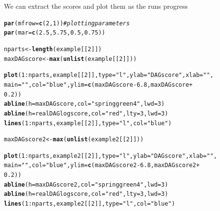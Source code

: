 \documentclass[a4paper]{article}\usepackage[]{graphicx}\usepackage[]{color}
\makeatletter
\newcommand{\hlnum}[1]{\textcolor[rgb]{0.686,0.059,0.569}{#1}}%
\newcommand{\hlstr}[1]{\textcolor[rgb]{0.192,0.494,0.8}{#1}}%
\newcommand{\hlcom}[1]{\textcolor[rgb]{0.678,0.584,0.686}{\textit{#1}}}%
\newcommand{\hlopt}[1]{\textcolor[rgb]{0,0,0}{#1}}%
\newcommand{\hlstd}[1]{\textcolor[rgb]{0.345,0.345,0.345}{#1}}%
\newcommand{\hlkwb}[1]{\textcolor[rgb]{0.69,0.353,0.396}{#1}}%
\newcommand{\hlkwc}[1]{\textcolor[rgb]{0.333,0.667,0.333}{#1}}%
\newcommand{\hlkwd}[1]{\textcolor[rgb]{0.737,0.353,0.396}{\textbf{#1}}}%
\newenvironment{kframe}{%
 \def\at@end@of@kframe{}%
 \ifinner\ifhmode%
  \def\at@end@of@kframe{\end{minipage}}%
  \begin{minipage}{\columnwidth}%
 \fi\fi%
 \def\FrameCommand##1{\hskip\@totalleftmargin \hskip-\fboxsep
 \colorbox{shadecolor}{##1}\hskip-\fboxsep
     \hskip-\linewidth \hskip-\@totalleftmargin \hskip\columnwidth}%
 \MakeFramed {\advance\hsize-\width
   \@totalleftmargin\z@ \linewidth\hsize
   \@setminipage}}%
 {\par\unskip\endMakeFramed%
 \at@end@of@kframe}
\newenvironment{knitrout}{}{} %
\makeatother
\begin{document}
We can extract the scores and plot them as the runs progress

\begin{knitrout}
\color{fgcolor}\begin{kframe}
\begin{alltt}
\hlkwd{par}\hlstd{(}\hlkwc{mfrow} \hlstd{=} \hlkwd{c}\hlstd{(}\hlnum{2}\hlstd{,} \hlnum{1}\hlstd{))}  \hlcom{# plotting parameters}
\hlkwd{par}\hlstd{(}\hlkwc{mar} \hlstd{=} \hlkwd{c}\hlstd{(}\hlnum{2.5}\hlstd{,} \hlnum{5.75}\hlstd{,} \hlnum{0.5}\hlstd{,} \hlnum{0.75}\hlstd{))}

\hlstd{nparts} \hlkwb{<-} \hlkwd{length}\hlstd{(example[[}\hlnum{2}\hlstd{]])}
\hlstd{maxDAGscore} \hlkwb{<-} \hlkwd{max}\hlstd{(}\hlkwd{unlist}\hlstd{(example[[}\hlnum{2}\hlstd{]]))}

\hlkwd{plot}\hlstd{(}\hlnum{1}\hlopt{:}\hlstd{nparts, example[[}\hlnum{2}\hlstd{]],} \hlkwc{type} \hlstd{=} \hlstr{"l"}\hlstd{,} \hlkwc{ylab} \hlstd{=} \hlstr{"DAG score"}\hlstd{,} \hlkwc{xlab} \hlstd{=} \hlstr{""}\hlstd{,}
    \hlkwc{main} \hlstd{=} \hlstr{""}\hlstd{,} \hlkwc{col} \hlstd{=} \hlstr{"blue"}\hlstd{,} \hlkwc{ylim} \hlstd{=} \hlkwd{c}\hlstd{(maxDAGscore} \hlopt{-} \hlnum{6.8}\hlstd{, maxDAGscore} \hlopt{+}
        \hlnum{0.2}\hlstd{))}
\hlkwd{abline}\hlstd{(}\hlkwc{h} \hlstd{= maxDAGscore,} \hlkwc{col} \hlstd{=} \hlstr{"springgreen4"}\hlstd{,} \hlkwc{lwd} \hlstd{=} \hlnum{3}\hlstd{)}
\hlkwd{abline}\hlstd{(}\hlkwc{h} \hlstd{= realDAGlogscore,} \hlkwc{col} \hlstd{=} \hlstr{"red"}\hlstd{,} \hlkwc{lty} \hlstd{=} \hlnum{3}\hlstd{,} \hlkwc{lwd} \hlstd{=} \hlnum{3}\hlstd{)}
\hlkwd{lines}\hlstd{(}\hlnum{1}\hlopt{:}\hlstd{nparts, example[[}\hlnum{2}\hlstd{]],} \hlkwc{type} \hlstd{=} \hlstr{"l"}\hlstd{,} \hlkwc{col} \hlstd{=} \hlstr{"blue"}\hlstd{)}

\hlstd{maxDAGscore2} \hlkwb{<-} \hlkwd{max}\hlstd{(}\hlkwd{unlist}\hlstd{(example2[[}\hlnum{2}\hlstd{]]))}

\hlkwd{plot}\hlstd{(}\hlnum{1}\hlopt{:}\hlstd{nparts, example2[[}\hlnum{2}\hlstd{]],} \hlkwc{type} \hlstd{=} \hlstr{"l"}\hlstd{,} \hlkwc{ylab} \hlstd{=} \hlstr{"DAG score"}\hlstd{,} \hlkwc{xlab} \hlstd{=} \hlstr{""}\hlstd{,}
    \hlkwc{main} \hlstd{=} \hlstr{""}\hlstd{,} \hlkwc{col} \hlstd{=} \hlstr{"blue"}\hlstd{,} \hlkwc{ylim} \hlstd{=} \hlkwd{c}\hlstd{(maxDAGscore2} \hlopt{-} \hlnum{6.8}\hlstd{, maxDAGscore2} \hlopt{+}
        \hlnum{0.2}\hlstd{))}
\hlkwd{abline}\hlstd{(}\hlkwc{h} \hlstd{= maxDAGscore2,} \hlkwc{col} \hlstd{=} \hlstr{"springgreen4"}\hlstd{,} \hlkwc{lwd} \hlstd{=} \hlnum{3}\hlstd{)}
\hlkwd{abline}\hlstd{(}\hlkwc{h} \hlstd{= realDAGlogscore,} \hlkwc{col} \hlstd{=} \hlstr{"red"}\hlstd{,} \hlkwc{lty} \hlstd{=} \hlnum{3}\hlstd{,} \hlkwc{lwd} \hlstd{=} \hlnum{3}\hlstd{)}
\hlkwd{lines}\hlstd{(}\hlnum{1}\hlopt{:}\hlstd{nparts, example2[[}\hlnum{2}\hlstd{]],} \hlkwc{type} \hlstd{=} \hlstr{"l"}\hlstd{,} \hlkwc{col} \hlstd{=} \hlstr{"blue"}\hlstd{)}
\end{alltt}
\end{kframe}


\end{knitrout}
\end{document}
